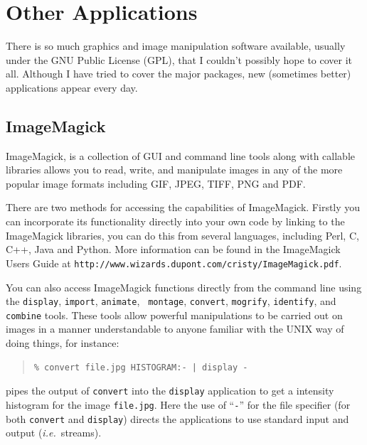 \documentclass[twoside,11pt]{article}
\newcommand{\htmladdnormallink}[2]{#1}
\newcommand{\latex}[1]{#1}
\newcommand{\xlabel}[1]{}
\begin{document}
\section{\xlabel{sc15_applications}Other Applications\label{sc15_applications}}

There is so much graphics and image manipulation software available,
usually under the \htmladdnormallink{GNU Public
License}{http://www.gnu.org/copyleft/gpl.html} (GPL), that I couldn't
possibly hope to cover it all. Although I have tried to cover the
major packages, new (sometimes better) applications appear every day.

\subsection{\xlabel{sc15_magick}ImageMagick\label{sc15_magick}}

\htmladdnormallink{ImageMagick}{http://www.wizards.dupont.com/cristy/ImageMagick.html},
is a collection of GUI and command line tools along with callable
libraries allows you to read, write, and manipulate images in any of
the more popular image formats including GIF, JPEG, TIFF, PNG and PDF.


There are two methods for accessing the capabilities of ImageMagick.
Firstly you can incorporate its functionality directly into your own
code by linking to the ImageMagick libraries, you can do this from
several languages, including Perl, C, C++, Java and Python. More
information can be found in the \htmladdnormallink{ImageMagick Users
Guide}{http://www.wizards.dupont.com/cristy/ImageMagick.pdf} \latex{at
{\tt http://www.wizards.dupont.com/cristy/ImageMagick.pdf}}.

You can also access ImageMagick functions directly from the command
line using the {\tt display}, {\tt import}, {\tt animate}, {\tt
montage}, {\tt convert}, {\tt mogrify}, {\tt identify}, and {\tt
combine} tools. These tools allow powerful manipulations to be carried
out on images in a manner understandable to anyone familiar with the
UNIX way of doing things, for instance:

\small
\begin{quote}
\begin{verbatim}
% convert file.jpg HISTOGRAM:- | display -
\end{verbatim}
\end{quote}
\normalsize

pipes the output of {\tt convert} into the {\tt display} application
to get a intensity histogram for the image {\tt file.jpg}. Here the
use of ``\verb+-+'' for the file specifier (for both {\tt convert} and
{\tt display}) directs the applications to use standard input and
output ({\em i.e.\ }streams).
\end{document}
